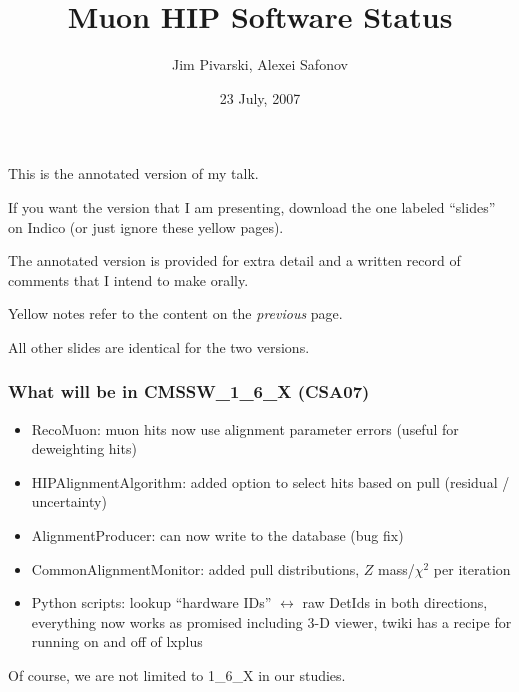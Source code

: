 \documentclass[compress]{beamer}
\title{Muon HIP Software Status}
\author{Jim Pivarski, Alexei Safonov}
\institute{Texas A\&M University}
\date{23 July, 2007}
\begin{document}
\frame{\titlepage}

\begin{notes}
\item This is the annotated version of my talk.
\item If you want the version that I am presenting, download the one
labeled ``slides'' on Indico (or just ignore these yellow pages).
\item The annotated version is provided for extra detail and a written
record of comments that I intend to make orally.
\item Yellow notes refer to the content on the {\it previous} page.
\item All other slides are identical for the two versions.
\end{notes}

\begin{frame}
\frametitle{What will be in CMSSW\_1\_6\_X (CSA07)}
\begin{itemize}\setlength{\itemsep}{0.25 cm}
\item RecoMuon: muon hits now use alignment parameter errors (useful for deweighting hits)
\item HIPAlignmentAlgorithm: added option to select hits based on pull (residual / uncertainty)
\item AlignmentProducer: can now write to the database (bug fix)
\item CommonAlignmentMonitor: added pull distributions, $Z$ mass/$\chi^2$ per iteration
\item Python scripts: lookup ``hardware IDs'' $\leftrightarrow$ raw DetIds in both directions, everything now works as promised including 3-D viewer, twiki has a recipe for running on and off of lxplus
\end{itemize}
Of course, we are not limited to 1\_6\_X in our studies.
\end{frame}
\end{document}
